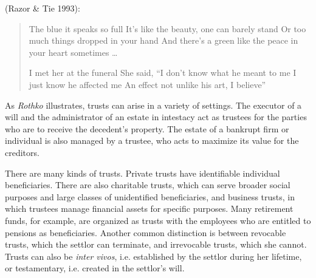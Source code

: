 

\item {} (Razor \& Tie
1993):
\begin{verse}
The blue it speaks so full\newline
It's like the beauty, one can barely stand\newline
Or too much things dropped in your hand\newline
And there's a green like the peace in your heart sometimes \ldots

I met her at the funeral\newline
She said, ``I don't know what he meant to me\newline
I just know he affected me\newline
An effect not unlike his art, I believe''
\end{verse}

\item As \textit{Rothko} illustrates, trusts can arise in a variety of settings.
The executor of a will and the administrator of an estate in intestacy act as
trustees for the parties who are to receive the decedent's property. The estate
of a bankrupt firm or individual is also managed by a trustee, who acts to
maximize its value for the creditors.


There are many kinds of trusts. Private trusts have identifiable individual
beneficiaries. There are also charitable trusts, which can serve broader social
purposes and large classes of unidentified beneficiaries, and business trusts,
in which trustees manage financial assets for specific purposes. Many retirement
funds, for example, are organized as trusts with the employees who are entitled
to pensions as beneficiaries. Another common distinction is between revocable
trusts, which the settlor can terminate, and irrevocable trusts, which she
cannot. Trusts can also be \textit{inter vivos}, i.e. established by the settlor
during her lifetime, or testamentary, i.e. created in the settlor's will.



